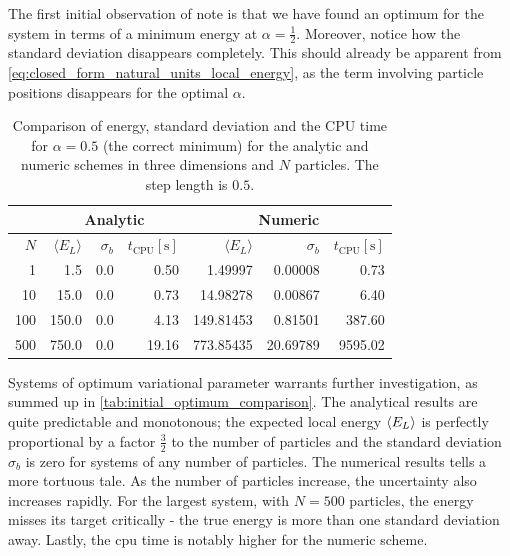 \documentclass[
    a4paper, aps, twocolumn, floatfix, superscriptaddress,
    nofootinbib]{revtex4-1}
\newcommand{\1}{\mathds{1}}
\begin{document}
        The first initial observation of note is that we have found an optimum
        for the system in terms of a minimum energy at $\alpha=\frac{1}{2}$.
        Moreover, notice how the standard deviation disappears completely.  This
        should already be apparent from
        \autoref{eq:closed_form_natural_units_local_energy}, as the term
        involving particle positions disappears for the optimal $\alpha$.

        \begin{table}
            \caption{Comparison of energy, standard deviation and the CPU time
            for $\alpha = 0.5$ (the correct minimum) for the analytic and
            numeric schemes in three dimensions and $N$ particles. The step
            length is $0.5$.}
            \centering
            \begin{ruledtabular}
                \begin{tabular}{r|rrr|rrr}
                    & \multicolumn{3}{c|}{Analytic}
                    & \multicolumn{3}{c}{Numeric} \\
                    \hline
                    $N$
                    & $\langle E_L\rangle$ & $\sigma_b$
                    & $t_{\text{CPU}} [\si{\second}]$
                    & $\langle E_L\rangle$ & $\sigma_b$
                    & $t_{\text{CPU}} [\si{\second}]$ \\
                    \hline
                    1 & 1.5 & 0.0 & 0.50
                    & 1.49997 & 0.00008 & 0.73 \\
                    10 & 15.0 & 0.0 & 0.73
                    & 14.98278 & 0.00867 & 6.40 \\
                    100 & 150.0 & 0.0 & 4.13
                    & 149.81453 & 0.81501 & 387.60 \\
                    500 & 750.0 & 0.0 & 19.16
                    & 773.85435 & 20.69789 & 9595.02
                \end{tabular}
            \end{ruledtabular}
            \label{tab:initial_optimum_comparison}
        \end{table}


        Systems of optimum variational parameter warrants further investigation,
        as summed up in \autoref{tab:initial_optimum_comparison}. The analytical
        results are quite predictable and monotonous; the expected local energy
        $\expval{E_L}$ is perfectly proportional by a factor $\frac{3}{2}$ to
        the number of particles and the standard deviation $\sigma_b$ is zero
        for systems of any number of particles. The numerical results tells a
        more tortuous tale. As the number of particles increase, the uncertainty
        also increases rapidly. For the largest system, with $N = 500$
        particles, the energy misses its target critically - the true energy is
        more than one standard deviation away. Lastly, the cpu time is notably
        higher for the numeric scheme.
\end{document}

